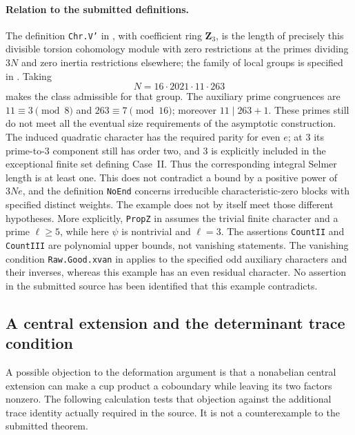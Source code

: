 \documentclass[11pt,a4paper]{article}
\theoremstyle{remark}
\newcommand{\src}[1]{\cite{#1}}
\begin{document}
\paragraph{Relation to the submitted definitions.}
The definition \texttt{Chr.V'} in
, with coefficient ring
$\mathbf Z_3$, is the length of precisely this divisible torsion
cohomology module with zero restrictions at the primes dividing $3N$
and zero inertia restrictions elsewhere; the family of local groups is
specified in .
Taking
\[
 N=16\cdot2021\cdot11\cdot263
\]
makes the class admissible for that group.  The auxiliary prime
congruences are $11\equiv3\pmod8$ and $263\equiv7\pmod{16}$; moreover $11\mid263+1$. These primes still do not meet all the eventual size requirements of the asymptotic construction.
The induced quadratic character has the required parity for even $e$;
at $3$ its prime-to-$3$ component still has order two, and $3$ is
explicitly included in the exceptional finite set defining Case~II.
Thus the corresponding integral Selmer length is at least one.
This does not contradict a bound by a positive power of $3Ne$, and
the definition \texttt{NoEnd} concerns irreducible characteristic-zero
blocks with specified distinct weights.  The example does not by
itself meet those different hypotheses.  More explicitly,
\texttt{PropZ} in  assumes the
trivial finite character and a prime $\ell\geq5$, while here $\psi$ is
nontrivial and $\ell=3$.  The assertions \texttt{CountII} and
\texttt{CountIII} are polynomial upper bounds, not vanishing
statements.  The vanishing condition \texttt{Raw.Good.xvan} in
 applies to the specified
odd auxiliary characters and their inverses, whereas this example has
an even residual character.  No assertion in the submitted source has
been identified that this example contradicts.

\src{S-even-selmer}

\subsection{A central extension and the determinant trace condition}

A possible objection to the deformation argument is that a nonabelian
central extension can make a cup product a coboundary while leaving its
two factors nonzero. The following calculation tests that objection
against the additional trace identity actually required in the source.
It is not a counterexample to the submitted theorem.
\end{document}
